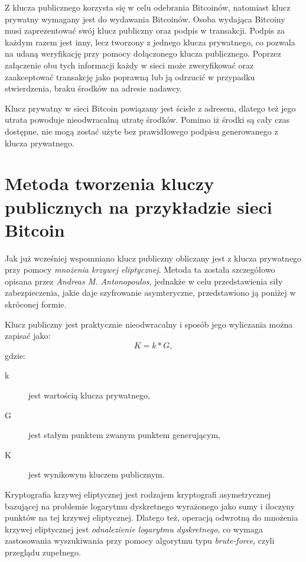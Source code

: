 \documentclass[12pt, twoside, final, openany]{mgr}
\begin{document}
\indent Z klucza publicznego korzysta się w celu odebrania Bitcoinów, natomiast klucz prywatny wymagany jest do wydawania Bitcoinów. Osoba wydająca Bitcoiny musi zaprezentować swój klucz publiczny oraz podpis w transakcji. Podpis za każdym razem jest inny, lecz tworzony z jednego klucza prywatnego, co pozwala na udaną weryfikację przy pomocy dołączonego klucza publicznego. Poprzez załączenie obu tych informacji każdy w sieci może zweryfikować oraz zaakceptować transakcję jako poprawną lub ją odrzucić w przypadku stwierdzenia, braku środków na adresie nadawcy. 

\indent Klucz prywatny w sieci Bitcoin powiązany jest ścisłe z adresem, dlatego też jego utrata powoduje nieodwracalną utratę środków. Pomimo iż środki są cały czas dostępne, nie mogą zostać użyte bez prawidłowego podpisu generowanego z klucza prywatnego.

\section{Metoda tworzenia kluczy publicznych na przykładzie sieci Bitcoin} \label{sec:tworzenieKluczyPublicznych}
\indent Jak już wcześniej wspomniano klucz publiczny obliczany jest z klucza prywatnego przy pomocy \textit{mnożenia krzywej eliptycznej}. Metoda ta została szczegółowo opisana przez \textit{Andreas M. Antonopoulos}\cite{Mastering}, jednakże w celu przedstawienia siły zabezpieczenia, jakie daje szyfrowanie asymteryczne, przedstawiono ją poniżej w skróconej formie. 

\indent Klucz publiczny jest praktycznie nieodwracalny i sposób jego wyliczania można zapisać jako:
\begin{equation}
\label{eq:1}
  K = k*G, 
\end{equation} 
gdzie:
\begin{description}
\item[k] jest wartością klucza prywatnego,
\item[G] jest stałym punktem zwanym punktem generującym,
\item[K] jest wynikowym kluczem publicznym.
\end{description}

Kryptografia krzywej eliptycznej jest rodzajem kryptografi asymetrycznej bazującej na problemie logarytmu dyskretnego wyrażonego jako sumy i iloczyny punktów na tej krzywej eliptycznej. Dlatego też, operacją odwrotną do mnożenia krzywej eliptycznej jest \textit{odnalezienie logarytmu dyskretnego}, co wymaga zastosowania wyszukiwania przy pomocy algorytmu typu \textit{brute-force}, czyli przeglądu zupełnego.
\end{document}
